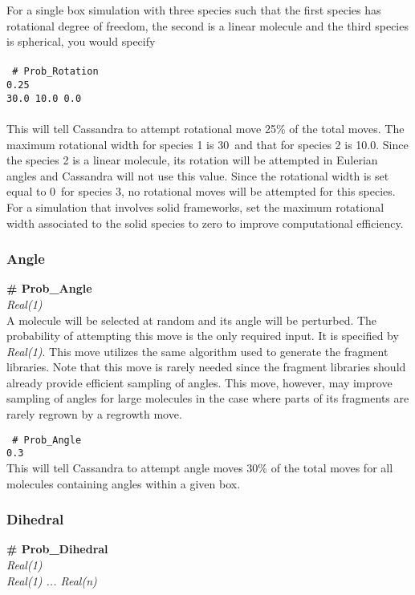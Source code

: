 For a single box simulation with three species such that the first species has rotational degree of freedom, the second is a linear molecule and the third species is spherical, you would specify \\ \\
%
\texttt{
{\# Prob\_Rotation} \\
 0.25 \\
30.0 10.0 0.0}
\\ \\
This will tell Cassandra to attempt rotational move 25\% of the total moves. 
The maximum rotational width for species 1 is 30\degree\ and that for species 2
 is 10.0\degree. Since the species 2 is a linear molecule, its rotation will
 be attempted in Eulerian angles and Cassandra will not use this value. 
Since the rotational width is set equal to 0\degree\ for species 3, no rotational moves will be attempted for this species.  \\

For a simulation that involves solid frameworks, set the
maximum rotational width associated to the solid species to zero to improve computational efficiency.


%
%
\subsubsection{Angle}
{\bf \# Prob\_Angle} \\
{\it Real(1)} \\ 
A molecule will be selected at random and its angle will be perturbed. 
The probability of attempting this move is the only required input. It is specified by {\it Real(1)}. This move utilizes the same algorithm used to generate the fragment libraries. Note that this move is rarely needed since the fragment libraries should already provide efficient sampling of angles. This move, however, may improve sampling of angles for large molecules in the case where parts of its fragments are rarely regrown by a regrowth move. 

%
\texttt{
\# Prob\_Angle \\
0.3 \\
}
%
This will tell Cassandra to attempt angle moves 30\% of the total moves for all molecules containing angles within a given box.

%
%
\subsubsection{Dihedral}
{\bf \# Prob\_Dihedral} \\
{\it Real(1)} \\ 
{\it Real(1) ... Real(n)} \\

